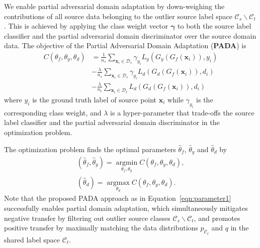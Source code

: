 \documentclass[runningheads]{llncs}
\begin{document}
We enable partial adversarial domain adaptation by down-weighing the contributions of all source data belonging to the outlier source label space $\mathcal{C}_s \backslash \mathcal{C}_t$. This is achieved by applying the class weight vector ${\bm\gamma}$ to both the source label classifier and the partial adversarial domain discriminator over the source domain data. The objective of the Partial Adversarial Domain Adaptation (\textbf{PADA}) is
\begin{equation}\label{eqn:MultiA}
\begin{aligned}
  C\left( {{\theta _f},{\theta _y},\theta _d} \right) &= \frac{1}{{{n_s}}}\sum\limits_{{\mathbf{x}_i} \in {\mathcal{D}_s}} {\gamma_{y_i}{L_y}\left( {{G_y}\left( {{G_f}\left( {{\mathbf{x}_i}} \right)} \right)}, y_i \right)}  \\
  & - \frac{\lambda}{{n_s}} \sum\limits_{{\mathbf{x}_i} \in {\mathcal{D}_s}} {\gamma_{y_i}L_d\left( {G_d\left( {{G_f}\left( {{{\mathbf{x}}_i}} \right)} \right),d_i} \right)} \\
  & - \frac{\lambda}{{n_t}} \sum\limits_{{\mathbf{x}_i} \in {\mathcal{D}_t}} {L_d\left( {G_d\left( {{G_f}\left( {{{\mathbf{x}}_i}} \right)} \right),d_i} \right)} 
\end{aligned}
\end{equation}  
where $y_i$ is the ground truth label of source point $\mathbf{x}_i$ while $\gamma_{y_i}$ is the corresponding class weight, and $\lambda$ is a hyper-parameter that trade-offs the source label classifier and the partial adversarial domain discriminator in the optimization problem.

The optimization problem finds the optimal parameters ${\hat\theta_f}$, ${\hat\theta_y}$ and ${\hat\theta_d}$ by
\begin{equation}\label{eqn:parameter1}
\begin{gathered}
     ({\hat\theta_f}, {\hat\theta_y}) =  \mathop {\arg\min }\limits_{{\theta _f},{\theta _y}} C\left( {{\theta _f},{\theta _y},\theta _d} \right), \\
     ({\hat\theta_d}) =  \mathop {\arg\max }\limits_{\theta_d} C\left( {\theta _f},{\theta _y},{\theta _d} \right).
\end{gathered}
\end{equation}
Note that the proposed PADA approach as in Equation~\eqref{eqn:parameter1} successfully enables partial domain adaptation, which simultaneously mitigates negative transfer by filtering out outlier source classes $\mathcal{C}_s \backslash \mathcal{C}_t$, and promotes positive transfer by maximally matching the data distributions $p_{\mathcal{C}_t}$ and $q$ in the shared label space $\mathcal{C}_t$.
\end{document}
